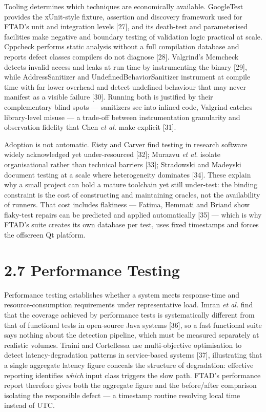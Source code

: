 \documentclass[
  12pt,
]{report}
\begin{document}
Tooling determines which techniques are economically available.
GoogleTest provides the xUnit-style fixture, assertion and discovery
framework used for FTAD's unit and integration levels {[}27{]}, and its
death-test and parameterised facilities make negative and boundary
testing of validation logic practical at scale. Cppcheck performs static
analysis without a full compilation database and reports defect classes
compilers do not diagnose {[}28{]}. Valgrind's Memcheck detects invalid
access and leaks at run time by instrumenting the binary {[}29{]}, while
Address\-Sanitizer and Undefined\-Behavior\-Sanitizer instrument at compile
time with far lower overhead and detect undefined behaviour that may
never manifest as a visible failure {[}30{]}. Running both is justified
by their complementary blind spots --- sanitizers see into inlined code,
Valgrind catches library-level misuse --- a trade-off between
instrumentation granularity and observation fidelity that Chen \emph{et
al.} make explicit {[}31{]}.

Adoption is not automatic. Eisty and Carver find testing in research
software widely acknowledged yet under-resourced {[}32{]}; Murazvu
\emph{et al.} isolate organisational rather than technical barriers
{[}33{]}; Stradowski and Madeyski document testing at a scale where
heterogeneity dominates {[}34{]}. These explain why a small project can
hold a mature toolchain yet still under-test: the binding constraint is
the cost of constructing and maintaining oracles, not the availability
of runners. That cost includes flakiness --- Fatima, Hemmati and Briand
show flaky-test repairs can be predicted and applied automatically
{[}35{]} --- which is why FTAD's suite creates its own database per
test, uses fixed timestamps and forces the offscreen Qt platform.

\section{2.7 Performance Testing}\label{performance-testing}

Performance testing establishes whether a system meets response-time and
resource-consumption requirements under representative load. Imran
\emph{et al.} find that the coverage achieved by performance tests is
systematically different from that of functional tests in open-source
Java systems {[}36{]}, so a fast functional suite says nothing about the
detection pipeline, which must be measured separately at realistic
volumes. Traini and Cortellessa use multi-objective optimisation to
detect latency-degradation patterns in service-based systems {[}37{]},
illustrating that a single aggregate latency figure conceals the
structure of degradation: effective reporting identifies \emph{which}
input class triggers the slow path. FTAD's performance report therefore
gives both the aggregate figure and the before/after comparison
isolating the responsible defect --- a timestamp routine resolving local
time instead of UTC.
\end{document}
